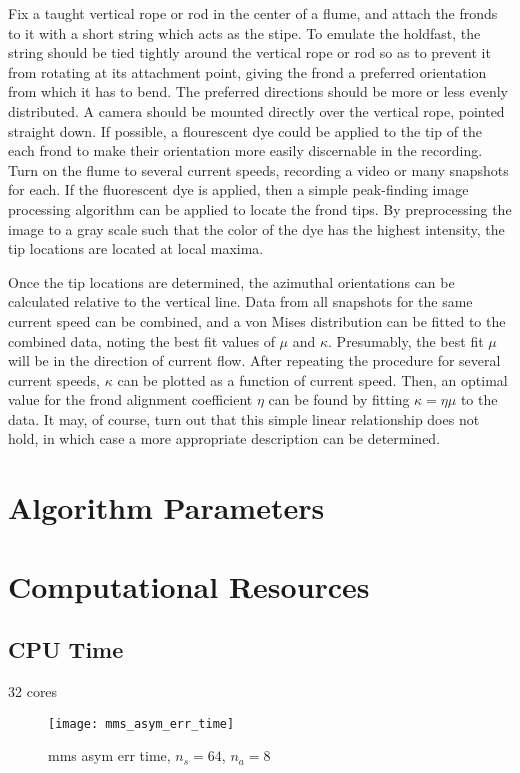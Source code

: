 Fix a taught vertical rope or rod in the center of a flume, and attach the fronds to it with a short string which acts as the stipe.
To emulate the holdfast, the string should be tied tightly around the vertical rope or rod so as to prevent it from rotating at its attachment point,
giving the frond a preferred orientation from which it has to bend.
The preferred directions should be more or less evenly distributed.
A camera should be mounted directly over the vertical rope, pointed straight down.
If possible, a flourescent dye could be applied to the tip of the each frond to make their orientation more easily discernable in the recording.
Turn on the flume to several current speeds, recording a video or many snapshots for each.
If the fluorescent dye is applied, then a simple peak-finding image processing algorithm can be applied to locate the frond tips.
By preprocessing the image to a gray scale such that the color of the dye has the highest intensity,
the tip locations are located at local maxima.

Once the tip locations are determined, the azimuthal orientations can be calculated relative to the vertical line.
Data from all snapshots for the same current speed can be combined, and a von Mises distribution can be fitted to the combined data,
noting the best fit values of $\mu$ and $\kappa$.
Presumably, the best fit $\mu$ will be in the direction of current flow.
After repeating the procedure for several current speeds, $\kappa$ can be plotted as a function of current speed.
Then, an optimal value for the frond alignment coefficient $\eta$ can be found by fitting $\kappa = \eta\mu$ to the data.
It may, of course, turn out that this simple linear relationship does not hold, in which case a more appropriate description can be determined.

\section{Algorithm Parameters}

\section{Computational Resources}
\subsection{CPU Time}
32 cores

\begin{figure}[H]
  \centering
  \texttt{[image: mms\_asym\_err\_time]}
  \caption{mms asym err time, $n_s=64$, $n_a=8$}
  \label{fig:mms_asym_err_time}
\end{figure}


